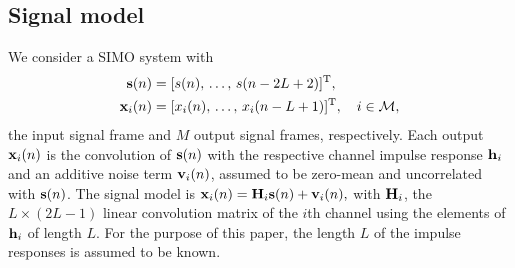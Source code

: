 \documentclass{article}
\begin{document}
\subsection[]{Signal model}
We consider a SIMO system with 
\begin{align}
    \bm{\mathrm{s}}(n) &= [s(n),\,\ldots,\,s(n-2L+2)]^{{\mathrm{T}}},\\
    \bm{\mathrm{x}}_i(n) &= [x_i(n),\,\ldots,\,x_i(n-L+1)]^{{\mathrm{T}}}, \quad i \in \mathcal{M},
\end{align}
the input signal frame and \(M\) output signal frames, respectively.
Each output \(\bm{\mathrm{x}}_i(n)\) is the convolution of \(\bm{\mathrm{s}}(n)\) with the respective channel impulse response \(\bm{\mathrm{h}}_i\) and an additive noise term \(\bm{\mathrm{v}}_i(n)\), assumed to be zero-mean and uncorrelated with \(\bm{\mathrm{s}}(n)\).
The signal model is \(\bm{\mathrm{x}}_i(n) = \bm{\mathrm{H}}_i \bm{\mathrm{s}}(n) + \bm{\mathrm{v}}_i(n),\)
with \(\bm{\mathrm{H}}_i\), the \(L \times (2L-1)\) linear convolution matrix of the \(i\)th channel using the elements of \(\bm{\mathrm{h}}_i\) of length \(L\).
For the purpose of this paper, the length \(L\) of the impulse responses is assumed to be known.
\end{document}
